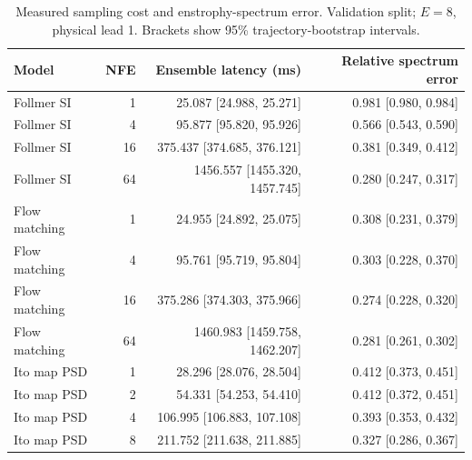 \begin{table}[t]
\centering
\small
\setlength{\tabcolsep}{3pt}
\caption{Measured sampling cost and enstrophy-spectrum error. Validation split; $E=8$, physical lead 1. Brackets show 95\% trajectory-bootstrap intervals.}
\label{tab:map-cost}
\begin{tabular}{lrrr}
\toprule
Model & NFE & Ensemble latency (ms) & Relative spectrum error \\
\midrule
Follmer SI & 1 & 25.087 [24.988, 25.271] & 0.981 [0.980, 0.984] \\
Follmer SI & 4 & 95.877 [95.820, 95.926] & 0.566 [0.543, 0.590] \\
Follmer SI & 16 & 375.437 [374.685, 376.121] & 0.381 [0.349, 0.412] \\
Follmer SI & 64 & 1456.557 [1455.320, 1457.745] & 0.280 [0.247, 0.317] \\
\addlinespace
Flow matching & 1 & 24.955 [24.892, 25.075] & 0.308 [0.231, 0.379] \\
Flow matching & 4 & 95.761 [95.719, 95.804] & 0.303 [0.228, 0.370] \\
Flow matching & 16 & 375.286 [374.303, 375.966] & 0.274 [0.228, 0.320] \\
Flow matching & 64 & 1460.983 [1459.758, 1462.207] & 0.281 [0.261, 0.302] \\
\addlinespace
Ito map PSD & 1 & 28.296 [28.076, 28.504] & 0.412 [0.373, 0.451] \\
Ito map PSD & 2 & 54.331 [54.253, 54.410] & 0.412 [0.372, 0.451] \\
Ito map PSD & 4 & 106.995 [106.883, 107.108] & 0.393 [0.353, 0.432] \\
Ito map PSD & 8 & 211.752 [211.638, 211.885] & 0.327 [0.286, 0.367] \\
\bottomrule
\end{tabular}
\end{table}
